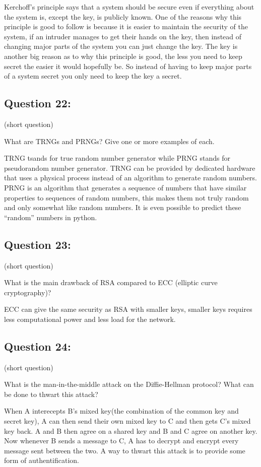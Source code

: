 \documentclass[11pt]{article}
\begin{document}
    Kerchoff's principle says that a system should be secure even if
everything about the system is, except the key, is publicly known. One
of the reasons why this principle is good to follow is because it is
easier to maintain the security of the system, if an intruder manages to
get their hands on the key, then instead of changing major parts of the
system you can just change the key. The key is another big reason as to
why this principle is good, the less you need to keep secret the easier
it would hopefully be. So instead of having to keep major parts of a
system secret you only need to keep the key a secret.

    \hypertarget{question-22}{%
\subsection{Question 22:}\label{question-22}}

(short question)

What are TRNGs and PRNGs? Give one or more examples of each.

    TRNG tsands for true random number generator while PRNG stands for
pseudorandom number generator. TRNG can be provided by dedicated
hardware that uses a physical process instead of an algorithm to
generate random numbers. PRNG is an algorithm that generates a sequence
of numbers that have similar properties to sequences of random numbers,
this makes them not truly random and only somewhat like random numbers.
It is even possible to predict these ``random'' numbers in python.

    \hypertarget{question-23}{%
\subsection{Question 23:}\label{question-23}}

(short question)

What is the main drawback of RSA compared to ECC (elliptic curve
cryptography)?

    ECC can give the same security as RSA with smaller keys, smaller keys
requires less computational power and less load for the network.

    \hypertarget{question-24}{%
\subsection{Question 24:}\label{question-24}}

(short question)

What is the man-in-the-middle attack on the Diffie-Hellman protocol?
What can be done to thwart this attack?

    When A interecepts B's mixed key(the combination of the common key and
secret key), A can then send their own mixed key to C and then gets C's
mixed key back. A and B then agree on a shared key and B and C agree on
another key. Now whenever B sends a message to C, A has to decrypt and
encrypt every message sent between the two. A way to thwart this attack
is to provide some form of authentification.


    
    
    
\end{document}
